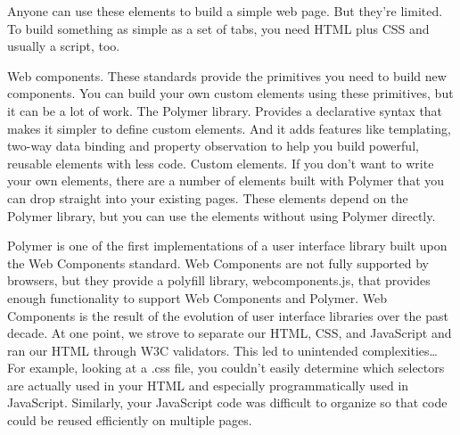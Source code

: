 Anyone can use these elements to build a simple web page. But they’re limited. To build something as simple as a set of tabs, you need HTML plus CSS and usually a script, too.

Web components. These standards provide the primitives you need to build new components. You can build your own custom elements using these primitives, but it can be a lot of work.
The Polymer library. Provides a declarative syntax that makes it simpler to define custom elements. And it adds features like templating, two-way data binding and property observation to help you build powerful, reusable elements with less code.
Custom elements. If you don’t want to write your own elements, there are a number of elements built with Polymer that you can drop straight into your existing pages. These elements depend on the Polymer library, but you can use the elements without using Polymer directly.

Polymer is one of the first implementations of a user interface library built upon the Web Components standard.  Web Components are not fully supported by browsers, but they provide a polyfill library, webcomponents.js, that provides enough functionality to support Web Components and Polymer.
Web Components is the result of the evolution of user interface libraries over the past decade.  At one point, we strove to separate our HTML, CSS, and JavaScript and ran our HTML through W3C validators. This led to unintended complexities…  For example, looking at a .css file, you couldn’t easily determine which selectors are actually used in your HTML and especially programmatically used in JavaScript.  Similarly, your JavaScript code was difficult to organize so that code could be reused efficiently on multiple pages.
